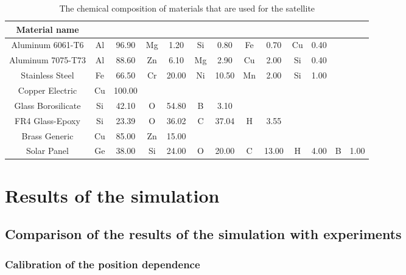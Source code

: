 \documentclass[12pt, a4paper,titlepage]{article}
\numberwithin{equation}{section}
\numberwithin{figure}{section}
\begin{document}
\begin{table}

\begin{center}
\begin{tabular}{ |c|c|c|c|c|c|c|c|c|c|c|c|c|} 
 \hline
Material name & &&&&&&&&&&& \\\hline

Aluminum 6061-T6 &	Al & 96.90 &	Mg &	1.20 &	Si &	0.80 &	Fe &	0.70 &	Cu &	0.40 & &\\\hline		
Aluminum 7075-T73 &	Al &	88.60 &	Zn &	6.10 &	Mg &	2.90 &	Cu &	2.00 &	Si &	0.40 & &\\\hline		
Stainless Steel &	Fe &	66.50 &	Cr &	20.00 &	Ni &	10.50	&Mn &	2.00 &	Si &	1.00 & &\\\hline		
Copper Electric  &Cu &	100.00 & & & & & & & & & &	\\\hline					
Glass Borosilicate &	Si &	42.10 &	O &	54.80 &	B &	3.10 & & & & & &\\\hline			
FR4 Glass-Epoxy &	Si &	23.39 &	O &	36.02 &	C &	37.04 &	H &	3.55 & & & &\\\hline		
Brass Generic &	Cu &	85.00 &	Zn &	15.00 & & & & & & & &\\\hline						
Solar Panel &	Ge &	38.00 &	Si &	24.00 &	O &	20.00 &	C &	13.00 &	H &	4.00 &	B &	1.00\\\hline
\end{tabular}
\end{center}
\caption{The chemical composition of materials that are used for the satellite}
\end{table}

\pagebreak

\section{Results of the simulation}
\subsection{Comparison of the results of the simulation with experiments}
\subsubsection{Calibration of the position dependence}
\end{document}
